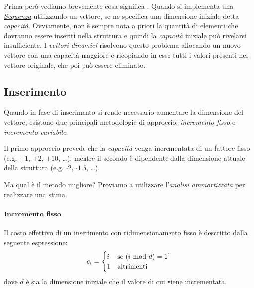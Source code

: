 Prima però vediamo brevemente cosa significa . Quando si implementa una \emph{\hyperref[def:27]{Sequenza}}
utilizzando un vettore, se ne specifica una dimensione iniziale detta
\emph{capacità}. Ovviamente, non è sempre nota a priori la quantità di elementi
che dovranno essere inseriti nella struttura e quindi la \emph{capacità} iniziale
può rivelarsi insufficiente. I \emph{vettori dinamici} risolvono questo problema
allocando un nuovo vettore con una capacità maggiore e ricopiando in esso tutti
i valori presenti nel vettore originale, che poi può essere eliminato.

\subsection{Inserimento}
Quando in fase di inserimento si rende necessario aumentare la dimensione del
vettore, esistono due principali metodologie di approccio: \emph{incremento fisso}
e \emph{incremento variabile}.

Il primo approccio prevede che la \emph{capacità} venga incrementata di un fattore
fisso (e.g. $+1$, $+2$, $+10$, \dots), mentre il secondo è dipendente dalla dimensione
attuale della struttura (e.g. $\cdot2$, $\cdot1.5$, \dots).

Ma qual è il metodo migliore? Proviamo a utilizzare l'\emph{analisi ammortizzata}
per realizzare una stima.

\paragraph{Incremento fisso}
Il costo effettivo di un inserimento con ridimensionamento fisso è descritto
dalla seguente espressione:
\[c_i=\begin{cases}
    i & \text{se}\ (i\Mod{d}) = 1\footnotemark\\
    1 & \text{altrimenti}
\end{cases}\]
dove $d$ è sia la dimensione iniziale che il valore di cui viene incrementata.

